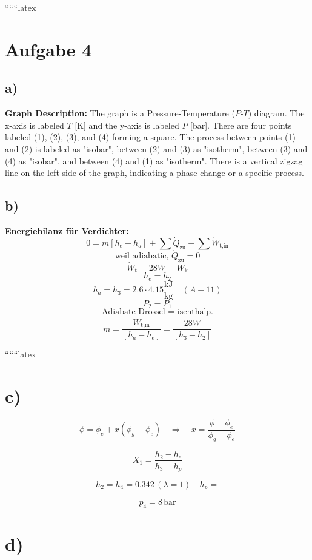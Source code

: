 
``````latex


\section*{Aufgabe 4}

\subsection*{a)}

\textbf{Graph Description:} The graph is a Pressure-Temperature ($P$-$T$) diagram. The x-axis is labeled $T$ [K] and the y-axis is labeled $P$ [bar]. There are four points labeled (1), (2), (3), and (4) forming a square. The process between points (1) and (2) is labeled as "isobar", between (2) and (3) as "isotherm", between (3) and (4) as "isobar", and between (4) and (1) as "isotherm". There is a vertical zigzag line on the left side of the graph, indicating a phase change or a specific process.

\subsection*{b)}


\textbf{Energiebilanz für Verdichter:}
\[
0 = \dot{m} \left[ h_e - h_a \right] + \sum \dot{Q}_{\text{zu}} - \sum \dot{W}_{\text{t,in}}
\]
\[
\text{weil adiabatic, } \dot{Q}_{\text{zu}} = 0
\]
\[
\dot{W}_{\text{t}} = 28W = \dot{W}_{\text{k}}
\]
\[
h_e = h_2
\]
\[
h_a = h_3 = 2.6 \cdot 4.15 \frac{\text{kJ}}{\text{kg}} \quad (A-11)
\]
\[
P_2 = P_1
\]
\[
\text{Adiabate Drossel = isenthalp.}
\]
\[
\dot{m} = \frac{\dot{W}_{\text{t,in}}}{\left[ h_a - h_e \right]} = \frac{28W}{\left[ h_3 - h_2 \right]}
\]

``````latex

\section*{c)}

\[
\phi = \phi_e + x (\phi_g - \phi_e) \quad \Rightarrow \quad x = \frac{\phi - \phi_e}{\phi_g - \phi_e}
\]

\[
X_1 = \frac{h_2 - h_e}{h_3 - h_p}
\]

\[
h_2 = h_4 = 0.342 \, (\lambda = 1) \quad h_p = 
\]

\[
p_4 = 8 \, \text{bar}
\]

\section*{d)}

